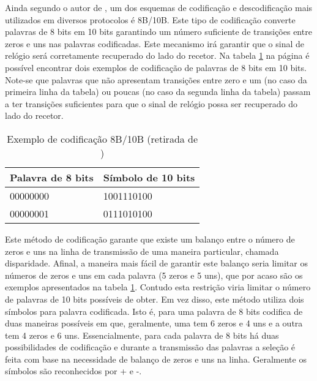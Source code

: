 Ainda segundo o autor de \cite{R032}, um dos esquemas de codificação e descodificação mais utilizados em diversos protocolos é 8B/10B. Este tipo de codificação converte palavras de 8 bits em 10 bits garantindo um número suficiente de transições entre zeros e uns nas palavras codificadas. Este mecanismo irá garantir que o sinal de relógio será corretamente recuperado do lado do recetor. Na tabela \ref{table:cod_8b_10b_ex} na página \pageref{table:cod_8b_10b_ex} é possível encontrar dois exemplos de codificação de palavras de 8 bits em 10 bits. Note-se que palavras que não apresentam transições entre zero e um (no caso da primeira linha da tabela) ou poucas (no caso da segunda linha da tabela) passam a ter transições suficientes para que o sinal de relógio possa ser recuperado do lado do recetor.

\begin{table}[h!]
	\centering

	\begin{tabular}{@{}ll@{}}
		\toprule
		\multicolumn{1}{c}{\textbf{Palavra de 8 bits}} & \multicolumn{1}{c}{\textbf{Símbolo de 10 bits}} \\ \midrule
		00000000                                       & 1001110100                                      \\
		00000001                                       & 0111010100                                      \\ \bottomrule
	\end{tabular}
	
	\caption[Exemplo de codificação 8B/10B]{Exemplo de codificação 8B/10B (retirada de \cite{R032})}
	\label{table:cod_8b_10b_ex}
\end{table}

Este método de codificação garante que existe um balanço entre o número de zeros e uns na linha de transmissão de uma maneira particular, chamada disparidade. Afinal, a maneira mais fácil de garantir este balanço seria limitar os números de zeros e uns em cada palavra (5 zeros e 5 uns), que por acaso são os exemplos apresentados na tabela \ref{table:cod_8b_10b_ex}. Contudo esta restrição viria limitar o número de palavras de 10 bits possíveis de obter. Em vez disso, este método utiliza dois símbolos para palavra codificada. Isto é, para uma palavra de 8 bits codifica de duas maneiras possíveis em que, geralmente, uma tem 6 zeros e 4 uns e a outra tem 4 zeros e 6 uns. Essencialmente, para cada palavra de 8 bits há duas possibilidades de codificação e durante a transmissão das palavras a seleção é feita com base na necessidade de balanço de zeros e uns na linha. Geralmente os símbolos são reconhecidos por + e -.

